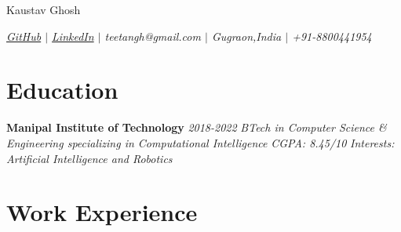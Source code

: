\documentclass{article}
\makeatletter
\renewcommand{\maketitle}{
    \begin{flushleft}        
        {\huge\rmfamily
        \theauthor}\newline
        \vspace{0.1em}
        \textit{teetangh@gmail.com -- github.com/teetangh}\newline
        \textit{Contact No. -- +91-8800441954}\newline
        \textit{Manipal Institute of Technology}\newline
        \textit{B.Tech in \textbf{Computer Science \& Engineering}}
        \textit{2018 - 2022}\newline
        \textit{Minor in \textbf{Computational Intelligence}}\newline
        \textit{CGPA: 8.45/10}\newline
    \end{flushleft}

}
\makeatother
\begin{document}
\thispagestyle{empty}  %


\begin{center}
    \huge{Kaustav Ghosh}

    \normalsize{
        \textit{
            \href{https://www.github.com/teetangh}{GitHub} \(|\)
            \href{https://www.linkedin.com/in/kaustav-ghosh-1538651bb/}{LinkedIn} \(|\)
            teetangh@gmail.com \(|\)
            Gugraon,India \(|\)
            +91-8800441954
        }}
\end{center}

\section*{Education}

\textbf{Manipal Institute of Technology} \hfill \textit{2018-2022}
\textmd{\newline \textit{BTech in Computer Science \& Engineering specializing in Computational Intelligence}} \hfill \textit{CGPA: 8.45/10}
\textmd{\newline \textit{Interests: Artificial Intelligence and Robotics}}



\section*{Work Experience}
\end{document}
